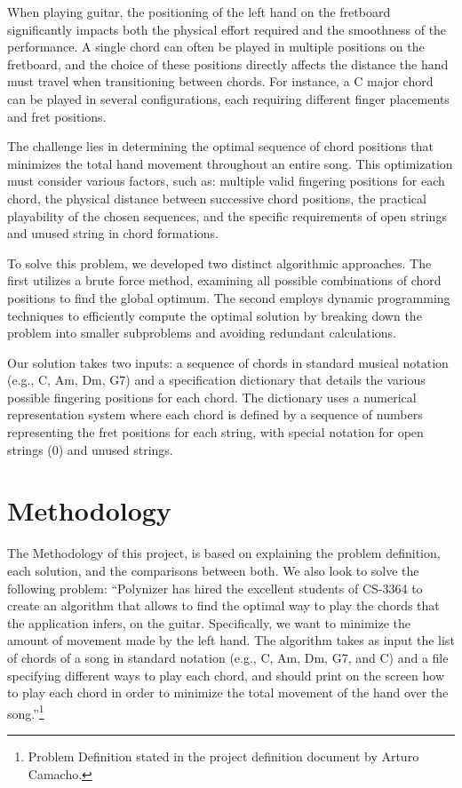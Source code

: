\documentclass[conference]{IEEEtran}
\begin{document}
When playing guitar, the positioning of the left hand on the fretboard significantly impacts both the physical effort required and the smoothness of the performance. A single chord can often be played in multiple positions on the fretboard, and the choice of these positions directly affects the distance the hand must travel when transitioning between chords. For instance, a C major chord can be played in several configurations, each requiring different finger placements and fret positions.

The challenge lies in determining the optimal sequence of chord positions that minimizes the total hand movement throughout an entire song. This optimization must consider various factors, such as: multiple valid fingering positions for each chord, the physical distance between successive chord positions, the practical playability of the chosen sequences, and the specific requirements of open strings and unused string in chord formations.

To solve this problem, we developed two distinct algorithmic approaches. The first utilizes a brute force method, examining all possible combinations of chord positions to find the global optimum. The second employs dynamic programming techniques to efficiently compute the optimal solution by breaking down the problem into smaller subproblems and avoiding redundant calculations.

Our solution takes two inputs: a sequence of chords in standard musical notation (e.g., C, Am, Dm, G7) and a specification dictionary that details the various possible fingering positions for each chord. The dictionary uses a numerical representation system where each chord is defined by a sequence of numbers representing the fret positions for each string, with special notation for open strings (0) and unused strings.

\section{Methodology}
The Methodology of this project, is based on explaining the problem definition, each solution, and the comparisons between both. We also look to solve the following problem:
\newline
\indent``Polynizer has hired the excellent students of CS-3364 to create an algorithm that allows to ﬁnd the optimal way to play the chords that the application infers, on the guitar. Speciﬁcally, we want to minimize the amount of movement made by the left hand. The algorithm takes as input the list of chords of a song in standard notation (e.g., C, Am, Dm, G7, and C) and a ﬁle specifying diﬀerent ways to play each chord, and should print on the screen how to play each chord in order to minimize the total movement of the hand over the song.''\footnote[1]{Problem Definition stated in the project definition document by Arturo Camacho.}
\end{document}
